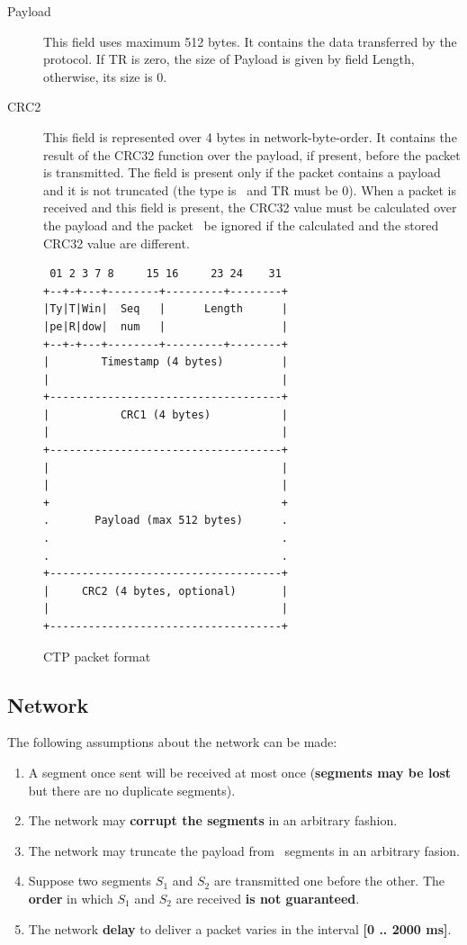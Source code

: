 \documentclass[12pt]{book}
\begin{document}
\begin{enumerate}[label=\arabic*.]
\begin{description}
    \item[Payload] This field uses maximum 512 bytes. It contains the data transferred by the protocol. If TR is zero, the size of Payload is given by field Length, otherwise, its size is 0.

    \item[CRC2] This field is represented over 4 bytes in network-byte-order. It contains the result of the CRC32 function over the payload, if present, before the packet is transmitted. The field is present only if the packet contains a payload and it is not truncated (the type is \pdata\ and TR must be 0). When a packet is received and this field is present, the CRC32 value must be calculated over the payload and the packet \must\ be ignored if the calculated and the stored CRC32 value are different.
\end{description}
\begin{figure}
    \centering
    \begin{minipage}{50ex}
\begin{verbatim}
 01 2 3 7 8     15 16     23 24    31
+--+-+---+--------+---------+--------+
|Ty|T|Win|  Seq   |      Length      |
|pe|R|dow|  num   |                  |
+--+-+---+--------+---------+--------+
|        Timestamp (4 bytes)         |
|                                    |
+------------------------------------+
|           CRC1 (4 bytes)           |
|                                    |
+------------------------------------+
|                                    |
|                                    |
+                                    +
.       Payload (max 512 bytes)      .
.                                    .
.                                    .
+------------------------------------+
|     CRC2 (4 bytes, optional)       |
|                                    |
+------------------------------------+
\end{verbatim}
    \end{minipage}
    \caption{CTP packet format}\label{fig:format}
\end{figure}

\subsection{Network}
The following assumptions about the network can be made:
\begin{enumerate}
    \item A segment once sent will be received at most once (\textbf{segments may be lost} but there are no duplicate segments).
    \item The network may \textbf{corrupt the segments} in an arbitrary fashion.
    \item The network may truncate the payload from \pdata\ segments in an arbitrary fasion.
    \item Suppose two segments $S_1$ and $S_2$ are transmitted one before the other. The \textbf{order} in which $S_1$ and $S_2$ are received \textbf{is not guaranteed}.
    \item The network \textbf{delay} to deliver a packet varies in the interval \textbf{[0 .. 2000 ms]}.
\end{enumerate}


\end{enumerate}
\end{document}
